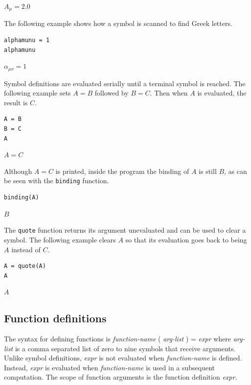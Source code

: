 \documentclass[12pt]{article}
\begin{document}
$\displaystyle A_\mu=2.0$

\bigskip

The following example shows how a symbol is scanned to find Greek letters.

{\color{blue}
\begin{verbatim}
alphamunu = 1
alphamunu
\end{verbatim}
}

$\displaystyle \alpha_{\mu\nu}=1$

\bigskip

Symbol definitions are evaluated serially until a terminal symbol is reached.
The following example sets $A=B$ followed by $B=C$.
Then when $A$ is evaluated, the result is $C$.

{\color{blue}
\begin{verbatim}
A = B
B = C
A
\end{verbatim}
}

$\displaystyle A=C$

\bigskip

Although $A=C$ is printed,
inside the program the binding of $A$ is still $B$, as can be seen with
the \verb$binding$ function.

{\color{blue}
\begin{verbatim}
binding(A)
\end{verbatim}
}

$\displaystyle B$

\bigskip

The \verb$quote$ function returns its argument unevaluated
and can be used to clear a symbol.
The following example clears $A$ so that its evaluation goes back to
being $A$ instead of $C$.

{\color{blue}
\begin{verbatim}
A = quote(A)
A
\end{verbatim}
}

$\displaystyle A$

\subsection{Function definitions}

The syntax for defining functions is {\it function-name} ( {\it arg-list} ) = {\it expr}
where {\it arg-list} is a comma separated list of zero to nine symbols that receive arguments.
Unlike symbol definitions, {\it expr} is not evaluated when {\it function-name} is defined.
Instead, {\it expr} is evaluated when {\it function-name} is used in a subsequent computation.
The scope of function arguments is the function definition {\it expr}.
\end{document}
